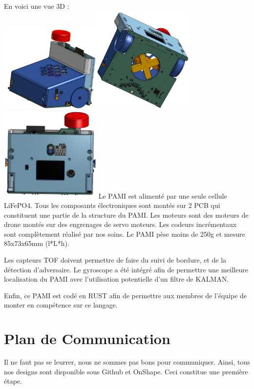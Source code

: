 \documentclass{article}
\begin{document}
En voici une vue 3D : \\
\includegraphics[width = 5cm]{pami_1}\includegraphics[width = 5cm]{pami_3}\includegraphics[width = 5cm]{pami_2}
Le PAMI est alimenté par une seule cellule LiFePO4.
Tous les composants électroniques sont montés sur 2 PCB qui constituent une partie de la structure du PAMI.
Les moteurs sont des moteurs de drone montés sur des engrenages de servo moteurs.
Les codeurs incrémentaux sont complètement réalisé par nos soins.
Le PAMI pèse moins de 250g et mesure 85x73x65mm (l*L*h).

Les capteurs TOF doivent permettre de faire du suivi de bordure, et de la détection d'adversaire.
Le gyroscope a été intégré afin de permettre une meilleure localisation du PAMI avec l'utilisation potentielle d'un filtre de KALMAN.

Enfin, ce PAMI est codé en RUST afin de permettre aux membres de l'équipe de monter en compétence sur ce langage.

\section{Plan de Communication}
Il ne faut pas se leurrer, nous ne sommes pas bons pour communiquer.
Ainsi, tous nos designs sont disponible sous Github et OnShape.
Ceci constitue une première étape.
\end{document}
